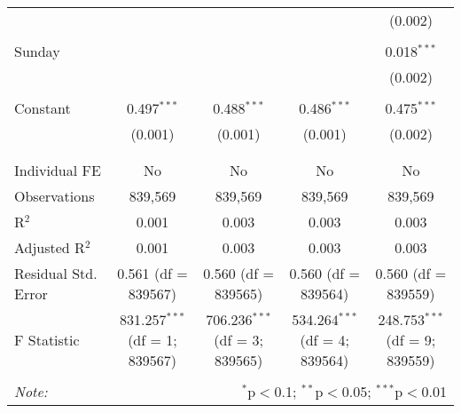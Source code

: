 \documentclass[
]{article}
\begin{document}
\begin{table}[!htbp]
{\begin{tabular}{@{\extracolsep{5pt}}lcccc}
  &  &  &  & (0.002) \\ 
  & & & & \\ 
 Sunday &  &  &  & 0.018$^{***}$ \\ 
  &  &  &  & (0.002) \\ 
  & & & & \\ 
 Constant & 0.497$^{***}$ & 0.488$^{***}$ & 0.486$^{***}$ & 0.475$^{***}$ \\ 
  & (0.001) & (0.001) & (0.001) & (0.002) \\ 
  & & & & \\ 
\hline \\[-1.8ex] 
Individual FE & No & No & No & No \\ 
Observations & 839,569 & 839,569 & 839,569 & 839,569 \\ 
R$^{2}$ & 0.001 & 0.003 & 0.003 & 0.003 \\ 
Adjusted R$^{2}$ & 0.001 & 0.003 & 0.003 & 0.003 \\ 
Residual Std. Error & 0.561 (df = 839567) & 0.560 (df = 839565) & 0.560 (df = 839564) & 0.560 (df = 839559) \\ 
F Statistic & 831.257$^{***}$ (df = 1; 839567) & 706.236$^{***}$ (df = 3; 839565) & 534.264$^{***}$ (df = 4; 839564) & 248.753$^{***}$ (df = 9; 839559) \\ 
\hline 
\hline \\[-1.8ex] 
\textit{Note:}  & \multicolumn{4}{r}{$^{*}$p$<$0.1; $^{**}$p$<$0.05; $^{***}$p$<$0.01} \\ 
\end{tabular}
} 
\end{table} 
\newpage
\end{document}
